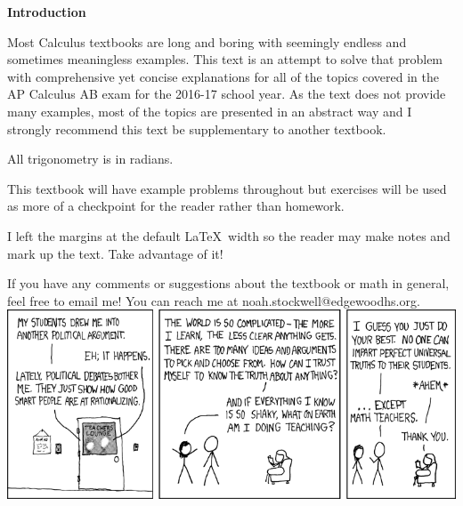\par \textbf{Introduction}
\vspace{0.125in}
\par Most Calculus textbooks are long and boring with seemingly endless and sometimes meaningless examples. This text is an attempt to solve that problem with comprehensive yet concise explanations for all of the topics covered in the AP Calculus AB exam for the 2016-17 school year. As the text does not provide many examples, most of the topics are presented in an abstract way and I strongly recommend this text be supplementary to another textbook.\\\par All trigonometry is in radians.\\\par This textbook will have example problems throughout but exercises will be used as more of a checkpoint for the reader rather than homework.\\\par I left the margins at the default \LaTeX\, width so the reader may make notes and mark up the text. Take advantage of it!\\\par If you have any comments or suggestions about the textbook or math in general, feel free to email me! You can reach me at noah.stockwell@edgewoodhs.org.
\vfill
\includegraphics[width=\textwidth]{images/teachers.png}
\vfill
